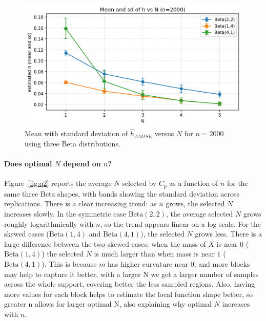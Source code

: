 \documentclass[11pt]{article}
\begin{document}
\begin{figure}[h]
\centering
\includegraphics[width=.85\linewidth]{output/h_vs_N_mean.png}
\caption{Mean with standard deviation of \(\hat h_{AMISE}\) versus \(N\) for \(n=2000\) using three Beta distributions.}
\label{fig:q1}
\end{figure}
\FloatBarrier

\paragraph{Does optimal \(N\) depend on \(n\)?}
Figure~\ref{fig:q2} reports the average \(N\) selected by \(C_p\) as a function of \(n\) for the same three Beta shapes, with bands showing the standard deviation across replications.
There is a clear increasing trend: as \(n\) grows, the selected \(N\) increases slowly.
In the symmetric case \(\mathrm{Beta}(2,2)\), the average selected \(N\) grows roughly logarithmically with \(n\), so the trend appears linear on a log scale.
For the skewed cases (\(\mathrm{Beta}(1,4)\) and \(\mathrm{Beta}(4,1)\)), the selected \(N\) grows less.
There is a large difference between the two skewed cases: when the mass of \(X\) is near \(0\) (\(\mathrm{Beta}(1,4)\)) the selected \(N\) is much larger than when mass is near \(1\) (\(\mathrm{Beta}(4,1)\)).
This is because \(m\) has higher curvature near \(0\), and more blocks may help to capture it better, with a larger N we get a larger number of samples across the whole support, covering better the less sampled regions.
Also, having more values for each block helps to estimate the local function shape better, so greater n allows for larger optimal N, also explaining why optimal \(N\) increases with \(n\).
\end{document}
